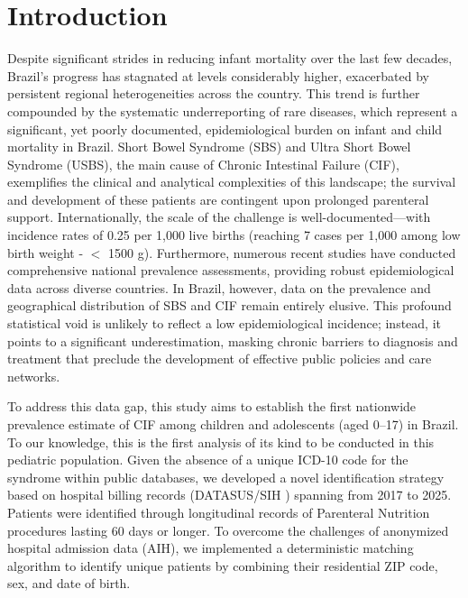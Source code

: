 \documentclass[12pt,a4paper]{article}
\theoremstyle{plain}
\theoremstyle{definition}
\theoremstyle{remark}
\begin{document}
\onehalfspacing

\section{Introduction}\label{sec1}

Despite significant strides in reducing infant mortality over the last few decades, Brazil's progress has stagnated at levels considerably higher, exacerbated by persistent regional heterogeneities across the country.\cite{unigme2025, brasil2024saes} This trend is further compounded by the systematic underreporting of rare diseases, which represent a significant, yet poorly documented, epidemiological burden on infant and child mortality in Brazil. Short Bowel Syndrome (SBS) and Ultra Short Bowel Syndrome (USBS), the main cause of Chronic Intestinal Failure (CIF), exemplifies the clinical and analytical complexities of this landscape; the survival and development of these patients are contingent upon prolonged parenteral support.\cite{modi2022aspen, elfadil2025ultra} Internationally, the scale of the challenge is well-documented---with incidence rates of 0.25 per 1,000 live births (reaching 7 cases per 1,000 among low birth weight - $<$ 1500 g). \cite{caporilli2023overview, cole2008very, alene2022time} Furthermore, numerous recent studies have conducted comprehensive national prevalence assessments, providing robust epidemiological data across diverse countries.\cite{wales2004neonatal, beath2011trends, puttonen2023pediatric} In Brazil, however, data on the prevalence and geographical distribution of SBS and CIF remain entirely elusive. This profound statistical void is unlikely to reflect a low epidemiological incidence; instead, it points to a significant underestimation, masking chronic barriers to diagnosis and treatment that preclude the development of effective public policies and care networks.\cite{brasil2024saes, leite2025multicenter}

To address this data gap, this study aims to establish the first nationwide prevalence estimate of CIF among children and adolescents (aged 0--17) in Brazil. To our knowledge, this is the first analysis of its kind to be conducted in this pediatric population.\cite{khokhar2025global} Given the absence of a unique ICD-10 code\cite{who2016icd10} for the syndrome within public databases, we developed a novel identification strategy based on hospital billing records (DATASUS/SIH \citep{datasus_sihsus}) spanning from 2017 to 2025. Patients were identified through longitudinal records of Parenteral Nutrition procedures lasting 60 days or longer. To overcome the challenges of anonymized hospital admission data (AIH), we implemented a deterministic matching algorithm to identify unique patients by combining their residential ZIP code, sex, and date of birth.
\end{document}
